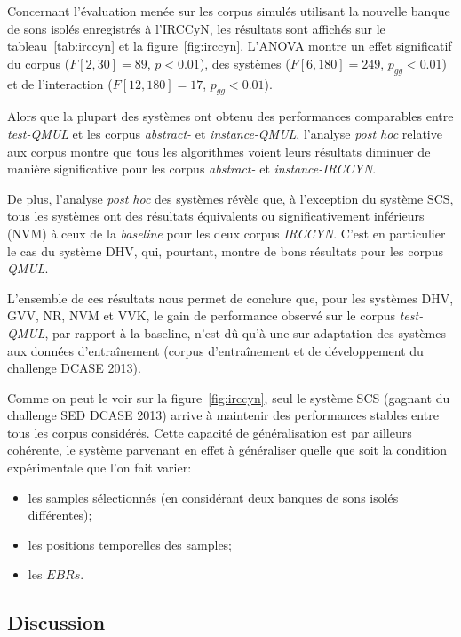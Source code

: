 Concernant l'évaluation menée sur les corpus simulés utilisant la nouvelle banque de sons isolés enregistrés à l'IRCCyN, les résultats sont affichés sur le tableau~\ref{tab:irccyn} et la figure~\ref{fig:irccyn}. L'ANOVA montre un effet significatif du corpus ($F[2,30]=89$, $p<0.01$), des systèmes ($F[6,180]=249$, $p_{gg}<0.01$) et de l'interaction ($F[12,180]=17$, $p_{gg}<0.01$).

Alors que la plupart des systèmes ont obtenu des performances comparables entre \emph{test-QMUL} et les corpus \emph{abstract-} et \emph{instance-QMUL}, l'analyse \emph{post hoc} relative aux corpus montre que tous les algorithmes voient leurs résultats diminuer de manière significative pour les corpus  \emph{abstract-} et \emph{instance-IRCCYN}.

De plus, l'analyse \emph{post hoc} des systèmes révèle que, à l'exception du système SCS, tous les systèmes ont des résultats équivalents ou significativement inférieurs (NVM) à ceux de la \emph{baseline} pour les deux corpus \emph{IRCCYN}. C'est en particulier le cas du système DHV, qui, pourtant, montre de bons résultats pour les corpus \emph{QMUL}.

L'ensemble de ces résultats nous permet de conclure que, pour les systèmes DHV, GVV, NR, NVM et VVK, le gain de performance observé sur le corpus \emph{test-QMUL}, par rapport à la baseline, n'est dû qu'à une sur-adaptation des systèmes aux données d'entraînement (corpus d'entraînement et de développement du challenge DCASE 2013). 

Comme on peut le voir sur la figure~\ref{fig:irccyn}, seul le système SCS (gagnant du challenge SED DCASE 2013) arrive à maintenir des performances stables entre tous les corpus considérés. Cette capacité de généralisation est par ailleurs cohérente, le système parvenant en effet à généraliser quelle que soit la condition expérimentale que l'on fait varier: 

\begin{itemize}
\item les samples sélectionnés (en considérant deux banques de sons isolés différentes);
\item les positions temporelles des samples;
\item les $EBRs$.
\end{itemize}

\subsection{Discussion}

